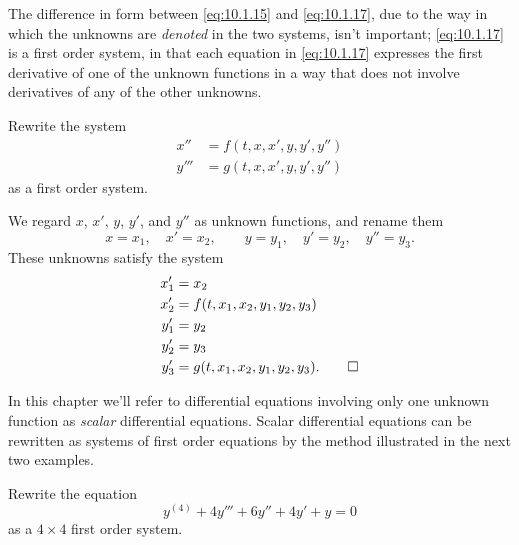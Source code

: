 \begin{remark*}
The difference in form between \eqref{eq:10.1.15} and
\eqref{eq:10.1.17}, due to the way in which the unknowns are \emph{\color{blue}denoted}
in the two systems, isn't  important; \eqref{eq:10.1.17} is a first
order system, in that each equation in \eqref{eq:10.1.17} expresses the
first derivative of one of the unknown functions in a way that does
not involve derivatives of any of the other unknowns.
\end{remark*}

\begin{example}\label{example:10.1.5}
 Rewrite the system
\begin{align*}
x''&=f(t,x,x',y,y',y'')\\
y'''&=g(t,x,x',y,y',y'')
\end{align*}
 as a first order system.
\end{example}

\begin{solution}
We regard $x$, $x'$, $y$, $y'$, and $y''$ as unknown functions, and
rename them
\[
x=x_1,\quad x'=x_2,\qquad y=y_1,\quad y'=y_2,\quad y''=y_3.
\]
These unknowns satisfy the system
\begin{align*}
x_1'&=x_2\\
x_2'&=f(t,x_1,x_2,y_1,y_2,y_3)\\
y_1'&=y_2\\
y_2'&=y_3\\
y_3'&=g(t,x_1,x_2,y_1,y_2,y_3).\qedhere
\end{align*}
\end{solution}



In this chapter we'll refer to differential equations involving only
one unknown function as \emph{\color{blue}scalar} differential equations. Scalar
differential equations can be rewritten as systems of first order
equations by the method illustrated in the next two examples.

\begin{example}\label{example:10.1.6}
Rewrite the equation
\begin{equation} \label{eq:10.1.18}
y^{(4)}+4y'''+6y''+4y'+y=0
\end{equation}
as a $4\times4$ first order system.
\end{example}


